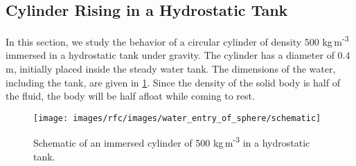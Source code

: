 
\FloatBarrier%
\subsection{Cylinder Rising in a Hydrostatic Tank}
\label{sec:water-entry-sphere}
In this section, we study the behavior of a circular cylinder of density $500$
kg\,m\textsuperscript{-3} immersed in a hydrostatic tank under gravity. The
cylinder has a diameter of $0.4$ m, initially placed inside the steady water
tank. The dimensions of the water, including the tank, are given in
\cref{fig:water-entry-sphere-schematic}. Since the density of the solid body is
half of the fluid, the body will be half afloat while coming to rest.
\begin{figure}[!htpb]
  \centering
  \texttt{[image: images/rfc/images/water\_entry\_of\_sphere/schematic]}
  \caption{Schematic of an immersed cylinder of 500 kg\,m\textsuperscript{-3}
    in a hydrostatic tank.}
\label{fig:water-entry-sphere-schematic}
\end{figure}

